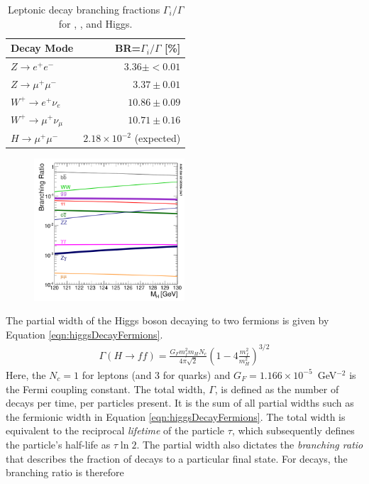 \begin{table}[htp]
\begin{center}
{\footnotesize
\begin{tabular}{l r}
\toprule
Decay Mode & BR=$\Gamma_i/\Gamma$ [\%] \\
\midrule
$Z\to e^+e^-$           & $3.36\pm<0.01$ \\
$Z\to \mu^+\mu^-$       & $3.37\pm0.01 $ \\
$W^+\to   e^+\nu_e$     & $10.86\pm0.09$ \\
$W^+\to \mu^+\nu_\mu$   & $10.71\pm0.16$ \\
$H\to \mu^+\mu^-$       & $2.18\times10^{-2}$ (expected) \\
\bottomrule
\end{tabular}
}
\caption{Leptonic decay branching fractions $\Gamma_i/\Gamma$ for \W, \Z, and Higgs. \cite{pdg2018}}
\label{tab:decayCrossSec}
\end{center}
\end{table}

\begin{figure}[h!]
\captionsetup[subfigure]{position=b}
\centering
\includegraphics[width=0.5\textwidth]{figures/pheno/higgsBr.png}
\caption{}
\label{fig:higgsBr}
\end{figure}

The partial width of the Higgs boson decaying to two fermions is given by Equation \ref{eqn:higgsDecayFermions}.
\begin{equation}\begin{split}\label{eqn:higgsDecayFermions}
\Gamma(H\to ff)=\frac{G_Fm_f^2m_HN_c}{4\pi\sqrt{2}}(1-4\frac{m_f^2}{m_H^2})^{3/2}
\end{split}\end{equation} 
Here, the $N_c=1$ for leptons (and 3 for quarks) and $G_F=1.166\times10^{-5}$~GeV$^{-2}$ is the Fermi coupling constant.
The total width, $\Gamma$, is defined as the number of decays per time, per particles present.
It is the sum of all partial widths such as the fermionic width in Equation \ref{eqn:higgsDecayFermions}.
The total width is equivalent to the reciprocal \emph{lifetime} of the particle $\tau$, which subsequently defines the particle's half-life as $\tau\ln2$.
The partial width also dictates the \emph{branching ratio} that describes the fraction of decays to a particular final state.
For \hmm decays, the branching ratio is therefore

